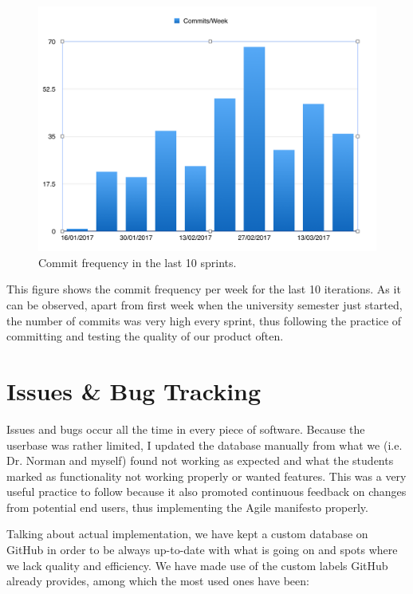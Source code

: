 \documentclass{l4proj}
\begin{document}
\begin{figure}[!ht]
    \centering
    \includegraphics[scale=0.5]{commits-week}
    \caption{Commit frequency in the last 10 sprints.}
    \label{fig:commits-week}
\end{figure}

This figure shows the commit frequency per week for the last 10 iterations. As it can be observed, apart from first week when
the university semester just started, the number of commits was very high every sprint, thus following the practice of
committing and testing the quality of our product often.

\section{Issues \& Bug Tracking}

Issues and bugs occur all the time in every piece of software. Because the userbase was rather limited, I updated the
database manually from what we (i.e. Dr. Norman and myself) found not working as expected and what the students marked as
functionality not working properly or wanted features. This was a very useful practice to follow because it also
promoted continuous feedback on changes from potential end users, thus implementing the Agile manifesto properly.

Talking about actual implementation, we have kept a custom database on GitHub in order to be always up-to-date with what
is going on and spots where we lack quality and efficiency. We have made use of the custom labels GitHub already provides,
among which the most used ones have been:
\end{document}
